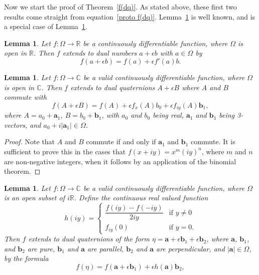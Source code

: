 \documentclass[12pt,reqno]{amsart}
\newtheorem{lemma}[theorem]{Lemma}
\begin{document}
Now we start the proof of Theorem~\ref{f(dq)}.  As stated above, these first two results come straight from equation~\eqref{proto f(dq)}.  Lemma~\ref{f(d)} is well known, and is a special case of Lemma~\ref{f(dq) commute}.

\begin{lemma}
\label{f(d)}
Let $f:\Omega \to \mathbb R$ be a continuously differentiable function, where $\Omega$ is open in $\mathbb R$.  Then $f$ extends to dual numbers $a + \epsilon b$ with $a \in \Omega$ by
\begin{equation}
\label{dual number case}
f(a + \epsilon b ) = f(a) + \epsilon f'(a) b .
\end{equation}
\end{lemma}

\begin{lemma}
\label{f(dq) commute}
Let $f:\Omega \to \mathbb C$ be a valid continuously differentiable function, where $\Omega$ is open in $\mathbb C$.  Then $f$ extends to dual quaternions $A + \epsilon B$ where $A$ and $B$ commute with
\begin{equation}
\label{commuting case}
f(A + \epsilon B ) = f(A) + \epsilon f_x(A) b_0
+ \epsilon f_{iy}(A) \bm b_1 ,
\end{equation}
where $A = a_0 + \bm a_1$, $B = b_0 + \bm b_1$, with $a_0$ and $b_0$ being real, $\bm a_1$ and $\bm b_1$ being 3-vectors, and $a_0 + i |\bm a_1| \in \Omega$.
\end{lemma}

\begin{proof}
Note that $A$ and $B$ commute if and only if $\bm a_1$ and $\bm b_1$ commute.  It is sufficient to prove this in the cases that $f(x+iy) = x^m (iy)^n$, where $m$ and $n$ are non-negative integers, when it follows by an application of the binomial theorem.
\end{proof}

\begin{lemma}
\label{f(dq) anti commute}
Let $f:\Omega \to \mathbb C$ be a valid continuously differentiable function, where $\Omega$ is an open subset of $i\mathbb R$.  Define the continuous real valued function
\begin{equation}
\label{h ident 2}
h(iy) = \begin{cases}
\dfrac{f(iy) - f(-iy)}{2iy} &\text{if $y \ne 0$} \\
f_{iy}(0) &\text{if $y = 0$} .
\end{cases}
\end{equation}
Then $f$ extends to dual quaternions of the form $\eta = \bm a + \epsilon \bm b_1 + \epsilon \bm b_2$, where $\bm a$, $\bm b_1$, and $\bm b_2$ are pure, $\bm b_1$ and $\bm a$ are parallel, $\bm b_2$ and $\bm a$ are perpendicular, and $|\bm a| \in \Omega$, by the formula
\begin{equation}
\label{f(dq) anti commute equ}
f(\eta) = f(\bm a + \epsilon \bm b_1) + \epsilon h(\bm a) \bm b_2 ,
\end{equation}
\end{lemma}
\end{document}
